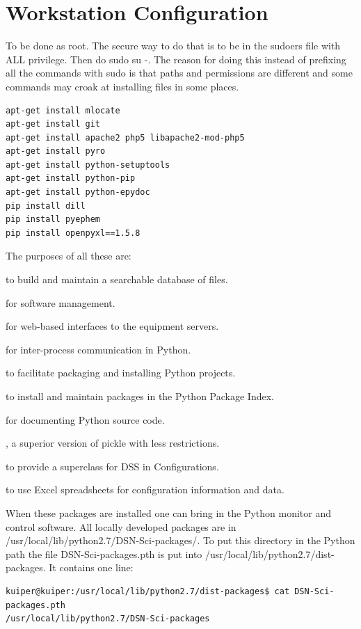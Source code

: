 \documentclass[letterpaper,11pt]{book}
\begin{document}
\chapter{Workstation Configuration}\label{app:ws-configure}

To be done as {\ttfamily root}.  The secure way to do that is to be in the
{\ttfamily sudoers} file with ALL privilege. Then do
{\ttfamily sudo su -}.  The reason for doing this instead of prefixing all the
commands with {\ttfamily sudo} is that paths and permissions are different and
some commands may croak at installing files in some places.
\begin{verbatim}
apt-get install mlocate
apt-get install git
apt-get install apache2 php5 libapache2-mod-php5
apt-get install pyro
apt-get install python-setuptools
apt-get install python-pip
apt-get install python-epydoc
pip install dill
pip install pyephem
pip install openpyxl==1.5.8\end{verbatim}
The purposes of all these are:
\begin{description}\itemsep0pt \parskip0pt 
\item [mlocate] to build and maintain a searchable database of files.
\item [git] for software management.
\item [apache2] for web-based interfaces to the equipment servers.
\item [pyro] for inter-process communication in Python.
\item [setuptools] to facilitate packaging and installing Python projects.
\item [pip] to install and maintain packages in the Python Package Index.
\item [epydoc] for documenting Python source code.
\item [dill], a superior version of {\ttfamily pickle} with less restrictions.
\item [pyephem] to provide a superclass for {\ttfamily DSS} in
{\ttfamily Configurations}.
\item [openpyxl] to use Excel spreadsheets for configuration information and
data.
\end{description}

When these packages are installed one can bring in the Python monitor and
control software. All locally developed packages are in
{\ttfamily /usr/local/lib/python2.7/DSN-Sci-packages/}.  To put this directory
in the Python path the file {\ttfamily DSN-Sci-packages.pth} is put into\linebreak
{\ttfamily /usr/local/lib/python2.7/dist-packages}.  It contains one line:
\begin{verbatim}
kuiper@kuiper:/usr/local/lib/python2.7/dist-packages$ cat DSN-Sci-packages.pth
/usr/local/lib/python2.7/DSN-Sci-packages\end{verbatim}
\end{document}
